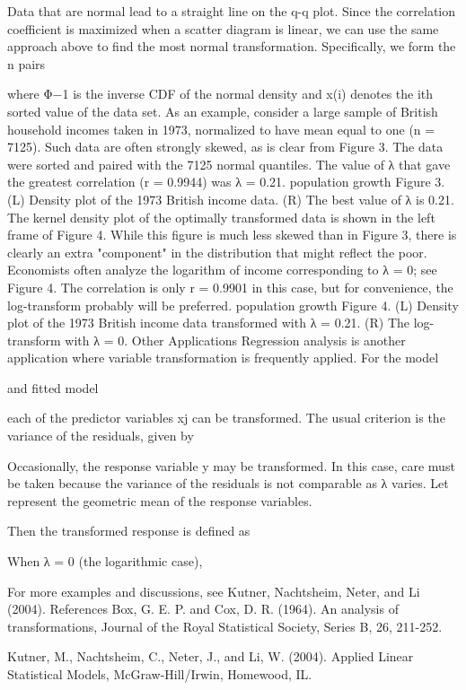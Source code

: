 Data that are normal lead to a straight line on the q-q plot. Since the correlation coefficient is maximized when a scatter diagram is linear, we can use the same approach above to find the most normal transformation.
Specifically, we form the n pairs


where Φ−1 is the inverse CDF of the normal density and x(i) denotes the ith sorted value of the data set. As an example, consider a large sample of British household incomes taken in 1973, normalized to have mean equal to one (n = 7125). Such data are often strongly skewed, as is clear from Figure 3. The data were sorted and paired with the 7125 normal quantiles. The value of λ that gave the greatest correlation (r = 0.9944) was λ = 0.21.
population growth
Figure 3. (L) Density plot of the 1973 British income data. (R) The best value of λ is 0.21.
The kernel density plot of the optimally transformed data is shown in the left frame of Figure 4. While this figure is much less skewed than in Figure 3, there is clearly an extra "component" in the distribution that might reflect the poor. Economists often analyze the logarithm of income corresponding to λ = 0; see Figure 4. The correlation is only r = 0.9901 in this case, but for convenience, the log-transform probably will be preferred.
population growth
Figure 4. (L) Density plot of the 1973 British income data transformed with λ = 0.21. (R) The log-transform with λ = 0.
Other Applications
Regression analysis is another application where variable transformation is frequently applied. For the model


and fitted model


each of the predictor variables xj can be transformed. The usual criterion is the variance of the residuals, given by


Occasionally, the response variable y may be transformed. In this case, care must be taken because the variance of the residuals is not comparable as λ varies. Let represent the geometric mean of the response variables.


Then the transformed response is defined as


 
When λ = 0 (the logarithmic case),


For more examples and discussions, see Kutner, Nachtsheim, Neter, and Li (2004).
References
Box, G. E. P. and Cox, D. R. (1964). An analysis of transformations, Journal of the Royal Statistical Society, Series B, 26, 211-252.

Kutner, M., Nachtsheim, C., Neter, J., and Li, W. (2004). Applied Linear Statistical Models, McGraw-Hill/Irwin, Homewood, IL.
